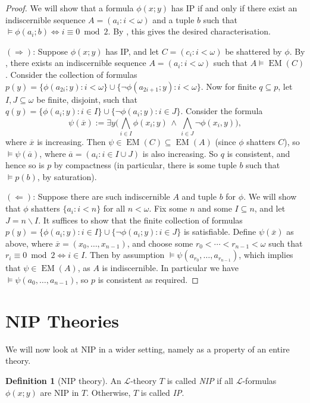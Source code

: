 \documentclass[a4paper]{report}
\newcommand{\ind}{\hspace{15pt}}
\renewcommand{\L}{\mathcal{L}}
\newcommand{\x}{\overline{x}}
\renewcommand{\a}{\overline{a}}
\renewcommand{\implies}{\Rightarrow}
\renewcommand{\iff}{\Leftrightarrow}
\DeclareMathOperator{\EM}{EM}
\theoremstyle{definition}
\newtheorem{defn}[thm]{Definition}
\theoremstyle{remstyle}
\begin{document}
\begin{proof}[Proof]
	We will show that a formula $\phi(x;y)$ has IP if and only if there exist an indiscernible sequence $A=(a_i:i<\omega)$ and a tuple $b$ such that $\models \phi(a_i;b) \iff i \equiv 0 \bmod 2$. By , this gives the desired characterisation.

	$(\implies)$: Suppose $\phi(x;y)$ has IP, and let $C=(c_i:i<\omega)$ be shattered by $\phi$. By , there exists an indiscernible sequence $A=(a_i:i<\omega)$ such that $A\models\EM(C)$. Consider the collection of formulas $p(y)=\{\phi(a_{2i};y):i<\omega\}\cup\{\neg\phi(a_{2i+1};y):i<\omega\}$. Now for finite $q\subseteq p$, let $I,J\subseteq \omega$ be finite, disjoint, such that $q(y) =\{\phi(a_i;y):i\in I\}\cup\{\neg\phi(a_i;y):i\in J\}$. Consider the formula
	\begin{equation*}
		\psi(\x) := \exists y\Big(\bigwedge_{i\in I}\phi(x_i;y)\,\wedge\,\bigwedge_{i\in J}\neg\phi(x_i,y)\Big),
	\end{equation*}
	where $\x$ is increasing. Then $\psi\in\EM(C)\subseteq\EM(A)$ (since $\phi$ shatters $C$), so $\models\psi(\a)$, where $\a=(a_i:i\in I\cup J)$ is also increasing. So $q$ is consistent, and hence so is $p$ by compactness (in particular, there is some tuple $b$ such that $\models p(b)$, by saturation).

	$(\Leftarrow)$: Suppose there are such indiscernible $A$ and tuple $b$ for $\phi$. We will show that $\phi$ shatters $\{a_i:i<n\}$ for all $n<\omega$. Fix some $n$ and some $I\subseteq n$, and let $J=n\backslash I$. It suffices to show that the finite collection of formulas $p(y)=\{\phi(a_i;y):i\in I\}\cup\{\neg\phi(a_i;y):i\in J\}$ is satisfiable. Define $\psi(\x)$ as above, where $\overline{x}=(x_0,\ldots,x_{n-1})$, and choose some $r_0<\cdots<r_{n-1}<\omega$ such that $r_i\equiv 0\bmod 2\iff i\in I$. Then by assumption $\models\psi(a_{r_0},\ldots,a_{r_{n-1}})$, which implies that $\psi\in\EM(A)$, as $A$ is indiscernible. In particular we have $\models\psi(a_0,\ldots,a_{n-1})$, so $p$ is consistent as required.
\end{proof}

\section{NIP Theories}

\ind We will now look at NIP in a wider setting, namely as a property of an entire theory.

\begin{defn}[NIP theory]
	An $\L$-theory $T$ is called \emph{NIP} if all $\L$-formulas $\phi(x;y)$ are NIP in $T$. Otherwise, $T$ is called \emph{IP}.
\end{defn}
\end{document}
